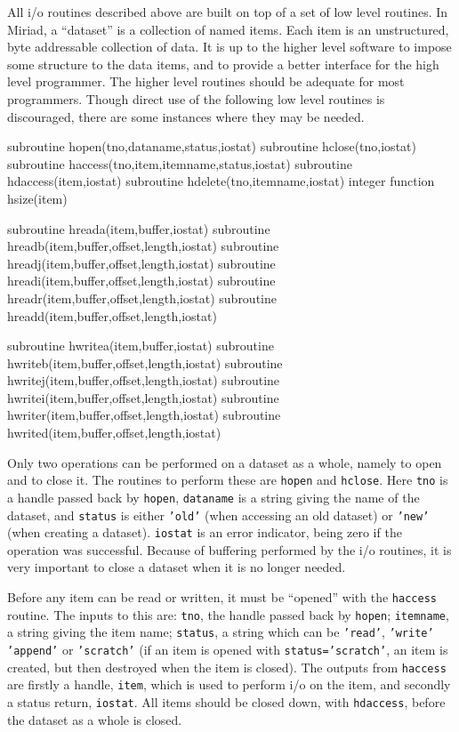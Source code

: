 All i/o routines described above are built on top of a set of
low level routines. In Miriad, a ``dataset'' is a collection of
named items. Each item is an unstructured, byte addressable collection of data.
It is up
to the higher level software to impose some structure to the data items, and
to provide a better interface for the high level programmer.
The higher level routines should be adequate for most
programmers. Though direct use of the following low level routines is
discouraged, there are some instances where they may be needed.
{\ninepoint\begintt
      subroutine hopen(tno,dataname,status,iostat)
      subroutine hclose(tno,iostat)
      subroutine haccess(tno,item,itemname,status,iostat)
      subroutine hdaccess(item,iostat)
      subroutine hdelete(tno,itemname,iostat)
      integer function hsize(item)

      subroutine hreada(item,buffer,iostat)
      subroutine hreadb(item,buffer,offset,length,iostat)
      subroutine hreadj(item,buffer,offset,length,iostat)
      subroutine hreadi(item,buffer,offset,length,iostat)
      subroutine hreadr(item,buffer,offset,length,iostat)
      subroutine hreadd(item,buffer,offset,length,iostat)

      subroutine hwritea(item,buffer,iostat)
      subroutine hwriteb(item,buffer,offset,length,iostat)
      subroutine hwritej(item,buffer,offset,length,iostat)
      subroutine hwritei(item,buffer,offset,length,iostat)
      subroutine hwriter(item,buffer,offset,length,iostat)
      subroutine hwrited(item,buffer,offset,length,iostat)

\endtt}
Only two operations can be performed on a dataset as a whole, namely to
open and to close it. The routines to perform these are
{\tt hopen} and {\tt hclose}. Here {\tt tno} is a handle passed back
by {\tt hopen}, {\tt dataname} is a string giving the name of the dataset,
and {\tt status} is either {\tt 'old'} (when accessing an old dataset)
or {\tt 'new'} (when creating a dataset). {\tt iostat} is an error
indicator, being zero if the operation was successful. Because of
buffering performed by the i/o routines, it is very
important to close a dataset when it is no longer needed.

Before any item can be read or written, it must be ``opened'' with the
{\tt haccess} routine. The inputs to this are: {\tt tno}, the handle passed
back by {\tt hopen}; {\tt itemname}, a string giving the item name;
{\tt status}, a string which can be {\tt 'read'}, {\tt 'write'} {\tt 'append'}
or {\tt 'scratch'} (if an item is opened with {\tt status='scratch'}, an item
is created, but then destroyed when the item is closed). The outputs from
{\tt haccess} are firstly a handle, {\tt item}, which is used to perform i/o on
the item, and secondly a status return, {\tt iostat}. All items should be
closed down, with {\tt hdaccess}, before the dataset as a whole is closed.


